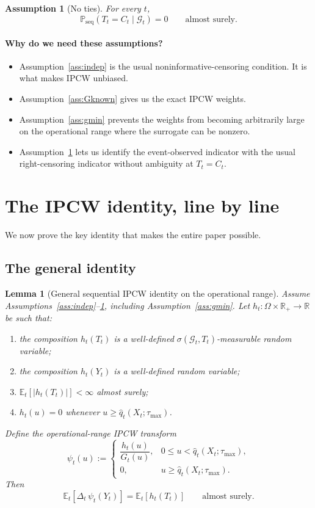 \documentclass[11pt]{article}
\newtheorem{lemma}{Lemma}
\newtheorem{assumption}{Assumption}
\newcommand{\R}{\mathbb{R}}
\newcommand{\E}{\mathbb{E}}
\newcommand{\Prob}{\mathbb{P}}
\newcommand{\1}{\mathbf{1}}
\newcommand{\seq}{\mathrm{seq}}
\newcommand{\cG}{\mathcal{G}}
\begin{document}
\begin{assumption}[No ties]
\label{ass:noties}
For every $t$,
\[
\Prob_{\seq}(T_t=C_t\mid \cG_t)=0
\qquad\text{almost surely.}
\]
\end{assumption}

\paragraph{Why do we need these assumptions?}
\begin{itemize}[leftmargin=*,itemsep=2pt]
  \item Assumption~\ref{ass:indep} is the usual noninformative-censoring condition. It is what makes IPCW unbiased.
  \item Assumption~\ref{ass:Gknown} gives us the exact IPCW weights.
  \item Assumption~\ref{ass:gmin} prevents the weights from becoming arbitrarily large on the operational range where the surrogate can be nonzero.
  \item Assumption~\ref{ass:noties} lets us identify the event-observed indicator with the usual right-censoring indicator without ambiguity at $T_t=C_t$.
\end{itemize}

\section{The IPCW identity, line by line}

We now prove the key identity that makes the entire paper possible.

\subsection{The general identity}

\begin{lemma}[General sequential IPCW identity on the operational range]
\label{lem:ipcw}
Assume Assumptions~\ref{ass:indep}--\ref{ass:noties}, including Assumption~\ref{ass:gmin}. Let $h_t:\Omega\times\R_+\to\R$ be such that:
\begin{enumerate}[leftmargin=*,label=(\roman*),itemsep=2pt]
  \item the composition $h_t(T_t)$ is a well-defined $\sigma(\cG_t,T_t)$-measurable random variable;
  \item the composition $h_t(Y_t)$ is a well-defined random variable;
  \item $\E_t[|h_t(T_t)|]<\infty$ almost surely;
  \item $h_t(u)=0$ whenever $u\ge \hat q_t(X_t;\tau_{\max})$.
\end{enumerate}
Define the operational-range IPCW transform
\[
\psi_t(u):=
\begin{cases}
\dfrac{h_t(u)}{G_t(u)}, & 0\le u<\hat q_t(X_t;\tau_{\max}),\\[1ex]
0, & u\ge \hat q_t(X_t;\tau_{\max}).
\end{cases}
\]
Then
\[
\E_t\![\Delta_t\,\psi_t(Y_t)]
=
\E_t[h_t(T_t)]
\qquad\text{almost surely.}
\]
\end{lemma}
\end{document}

